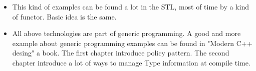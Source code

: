 \documentclass[a4paper,11pt,twoside]{book}
\begin{document}
\begin{itemize}
\begin{lstlisting}[frame=single, language=c++]
// traits with case-insensitive eq:
struct custom_traits: std::char_traits<char> {
	static bool eq (char c, char d) { 
	return std::tolower(c)==std::tolower(d); 
}
	
// some (non-conforming) implementations of basic_string::find 
//call this instead of eq:
static const char* find (const char* s, std::size_t n, char c)
	{ while( n-- && (!eq(*s,c)) ) ++s; return s; }
};
	
int main (){
	std::basic_string<char,custom_traits> str ("Test");
	std::cout << "T found at position " << str.find('t') << '\n';
}
\end{lstlisting}
	
	\item This kind of examples can be found a lot in the STL, most of time by a kind of functor. Basic idea is the same.
	
	\item All above technologies are part of generic programming. A good and more example about generic programming examples can be found in "Modern C++ desing" a book. The first chapter introduce policy pattern. The second chapter introduce a lot of ways to manage Type information at compile time. 
	
\end{itemize}
\end{document}
